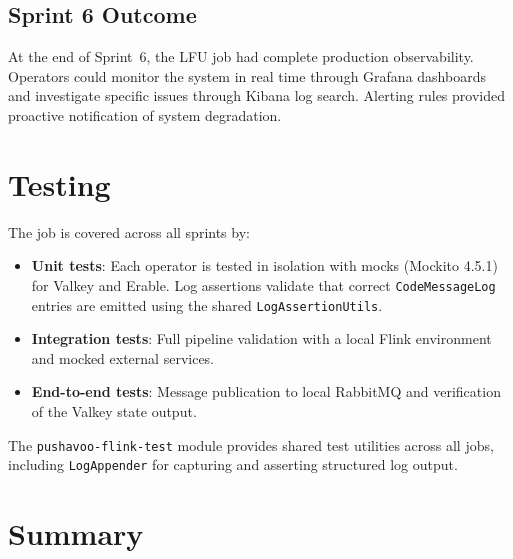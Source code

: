 \subsection{Sprint 6 Outcome}

At the end of Sprint~6, the LFU job had complete production observability. Operators could monitor the system in real time through Grafana dashboards and investigate specific issues through Kibana log search. Alerting rules provided proactive notification of system degradation.

\section{Testing}
\label{sec:testing}

The job is covered across all sprints by:
\begin{itemize}
    \item \textbf{Unit tests}: Each operator is tested in isolation with mocks (Mockito 4.5.1) for Valkey and Erable. Log assertions validate that correct \texttt{CodeMessageLog} entries are emitted using the shared \texttt{LogAssertionUtils}.
    \item \textbf{Integration tests}: Full pipeline validation with a local Flink environment and mocked external services.
    \item \textbf{End-to-end tests}: Message publication to local RabbitMQ and verification of the Valkey state output.
\end{itemize}

The \texttt{pushavoo-flink-test} module provides shared test utilities across all jobs, including \texttt{LogAppender} for capturing and asserting structured log output.

\section{Summary}
\label{sec:implementation-summary}

